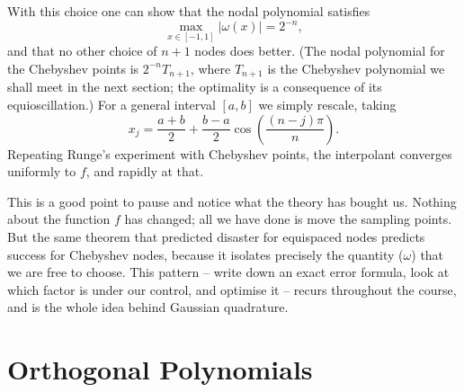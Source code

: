 \documentclass[a4paper]{scrartcl}
\providecommand{\abs}[1]{\left\lvert#1\right\rvert}
\renewcommand{\abs}[1]{\left\lvert#1\right\rvert}
\begin{document}
\begin{center}
\end{center}

With this choice one can show that the nodal polynomial satisfies
$$
\max_{x \in [-1,1]}\abs{\omega(x)} = 2^{-n},
$$
and that no other choice of $n+1$ nodes does better. (The nodal polynomial for the Chebyshev points is $2^{-n}T_{n+1}$, where $T_{n+1}$ is the Chebyshev polynomial we shall meet in the next section; the optimality is a consequence of its equioscillation.) For a general interval $[a,b]$ we simply rescale, taking
$$
x_j = \frac{a+b}{2} + \frac{b-a}{2}\cos\left(\frac{(n-j)\pi}{n}\right).
$$
Repeating Runge's experiment with Chebyshev points, the interpolant converges uniformly to $f$, and rapidly at that.

\begin{remark}
  This is a good point to pause and notice what the theory has bought us. Nothing about the function $f$ has changed; all we have done is move the sampling points. But the same theorem that predicted disaster for equispaced nodes predicts success for Chebyshev nodes, because it isolates precisely the quantity ($\omega$) that we are free to choose. This pattern -- write down an exact error formula, look at which factor is under our control, and optimise it -- recurs throughout the course, and is the whole idea behind Gaussian quadrature.
\end{remark}


\section{Orthogonal Polynomials}
\end{document}
